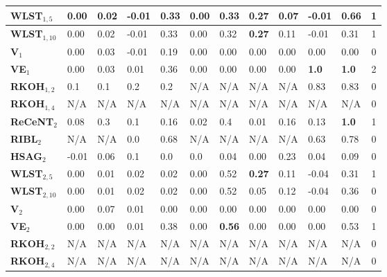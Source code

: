 \begin{table*}[t]
\begin{center}
\begin{tabular}[t]{|p{1.3cm}|p{0.6cm}|p{0.6cm}|p{0.6cm}|p{0.5cm}|p{0.5cm}|p{0.5cm}|p{0.5cm}|p{0.6cm}|p{0.6cm}|p{0.6cm}|c|}
	\hline
	\textbf{WLST$_{1,5}$}    & 0.00 & 0.02        &    -0.01    	&   0.33     &    0.00 	 & 0.33 & \textbf{0.27} & 0.07  & -0.01 & 0.66 & 1      \\
	\hline
	\textbf{WLST$_{1,10}$}    & 0.00 & 0.02      &   -0.01    & 0.33        &   0.00  & 0.32  & \textbf{0.27} & 0.11 & -0.01 & 0.31 & 1       \\
	\hline
	\textbf{V$_1$}    & 0.00  & 0.03         &   -0.01       	&   0.19      &   0.00    	 &  0.00   & 0.00 & 0.00  & 0.00 & 0.00 & 0     \\
	\hline
	\textbf{VE$_1$}    & 0.00 & 0.03         &     0.01   	& 0.36         &  0.00 	 & 0.00   &0.00  & 0.00 & \textbf{1.0}  &  \textbf{1.0} & 2     \\
	\hline
	\textbf{RKOH$_{1,2}$}    & 0.1 & 0.1         &  0.2      	&   0.2       &  N/A 	 & N/A   & N/A  & N/A 			& 0.83  &  0.83 & 0    \\
	\hline
	\textbf{RKOH$_{1,4}$}    & N/A & N/A         &     N/A   	& N/A         &  N/A 	 & N/A   & N/A  & N/A 			&  N/A  & N/A & 0     \\
	\hline
	\hline
	\textbf{ReCeNT$_2$}    &  0.08  & 0.3    & 0.1	 	&  0.16  	    	  &  0.02   &  0.4 & 0.01 & 0.16 & 0.13 & \textbf{1.0} & 1 \\
	\hline
	\textbf{RIBL$_2$}    &  N/A            &   N/A		     &   0.0			&  0.68    &  N/A              &  N/A      & N/A & N/A   & 0.63 & 0.78 & 0   \\
	\hline
	\textbf{HSAG$_2$}    &  -0.01          &   0.06	         &   0.1     	 	&  0.0          	  &  0.0       	  	  &  0.04      & 0.00 & 0.23  & 0.04 & 0.09 & 0  \\
	\hline
	\textbf{WLST$_{2,5}$}    &     0.00    &   0.01      &   0.02	 	&  0.02        	  &     0.00 &  0.52  & \textbf{0.27} & 0.11   & -0.04 & 0.31 & 1  \\
	\hline
	\textbf{WLST$_{2,10}$}    &      0.00      &  0.01       &   	 0.02	&  0.02        	  &     0.00  &  0.52  & 0.05 & 0.12  & -0.04 & 0.36 & 0   \\
	\hline
	\textbf{V$_2$}    &    0.00     &   0.07     &     0.01 	 	&   0.00      	  &       0.00	  & 0.00 & 0.00 & 0.00  & 0.00 & 0.00 & 0  \\
	\hline
	\textbf{VE$_2$}    & 0.00   &  0.00          &   0.01 	 	&  0.38   	  &   0.00  	  & \textbf{0.56}    & 0.00 & 0.00  & 0.00 & 0.53 & 1   \\
	\hline
	\textbf{RKOH$_{2,2}$}    & N/A  & N/A         &  N/A      	& N/A         &  N/A 	 & N/A   & N/A  & N/A 			& N/A  & N/A & 0     \\
	\hline
	\textbf{RKOH$_{2,4}$}    & N/A & N/A         &     N/A   	& N/A         &  N/A 	 & N/A   & N/A  & N/A 			&  N/A  & N/A & 0   \\
	\hline
\end{tabular}



\end{center}
\end{table*}




